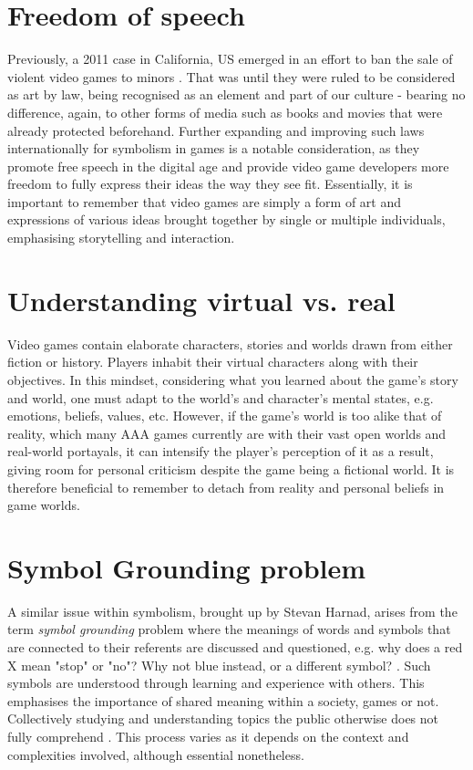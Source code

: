 \documentclass{scrartcl}
\begin{document}
\section{Freedom of speech}
Previously, a 2011 case in California, US emerged in an effort to ban the sale of violent video games to minors \cite{brownv}. That was until they were ruled to be considered as art by law, being recognised as an element and part of our culture - bearing no difference, again, to other forms of media such as books and movies that were already protected beforehand. Further expanding and improving such laws internationally for symbolism in games is a notable consideration, as they promote free speech in the digital age and provide video game developers more freedom to fully express their ideas the way they see fit. Essentially, it is important to remember that video games are simply a form of art and expressions of various ideas brought together by single or multiple individuals, emphasising storytelling and interaction.

\section{Understanding virtual vs. real}
Video games contain elaborate characters, stories and worlds drawn from either fiction or history. Players inhabit their virtual characters along with their objectives. In this mindset, considering what you learned about the game's story and world, one must adapt to the world's and character's mental states, e.g. emotions, beliefs, values, etc. However, if the game's world is too alike that of reality, which many AAA games currently are with their vast open worlds and real-world portayals, it can intensify the player's perception of it as a result, giving room for personal criticism despite the game being a fictional world. It is therefore beneficial to remember to detach from reality and personal beliefs in game worlds.

\section{Symbol Grounding problem}
A similar issue within symbolism, brought up by Stevan Harnad, arises from the term \textit{symbol grounding} problem where the meanings of words and symbols that are connected to their referents are discussed and questioned, e.g. why does a red X mean "stop" or "no"? Why not blue instead, or a different symbol? \cite{harnad} \cite{davidmyers}. Such symbols are understood through learning and experience with others. This emphasises the importance of shared meaning within a society, games or not. Collectively studying and understanding topics the public otherwise does not fully comprehend \cite{simon}. This process varies as it depends on the context and complexities involved, although essential nonetheless. 
\end{document}
